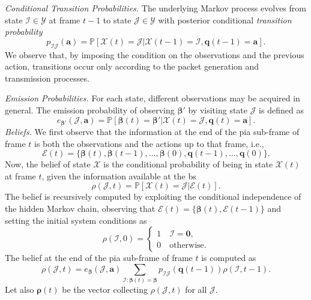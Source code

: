 \documentclass[conference]{IEEEtran}
\begin{document}
\vspace{5pt}\noindent\emph{Conditional Transition Probabilities.}
The underlying Markov process evolves from state $\bm{\mathcal{I}}\in \mathcal{Y}$  at frame $t-1$  to state $\bm{\mathcal{J}}\in \mathcal{Y}$  with  posterior conditional \textit{transition probability}
\begin{equation}\label{transProb}
    p_{\bm{\mathcal{I}}\bm{\mathcal{J}}}(\bm{a}) = \mathbb{P}\left[\bm{\mathcal{X}}(t) =\bm{\mathcal{J}} |\bm{\mathcal{X}}(t-1) = \bm{\mathcal{I}}, \bm{q}(t-1)= \bm{a}\right]. 
\end{equation}
We observe that, by imposing the condition on the observations and the previous action, transitions occur only according to the packet generation and transmission processes. 


\vspace{5pt}\noindent\emph{Emission Probabilities.}
For each state, different observations may be acquired in general. The emission probability of observing $\bm{\beta}'$ by visiting state $\bm{\mathcal{J}}$ is defined as
\begin{equation}
    e_{\bm{\beta}'}(\bm{\mathcal{J}}, \bm{a}) = \mathbb{P}[\bm{\beta}(t) = \bm{\beta}' | \bm{\mathcal{X}}(t) = \bm{\mathcal{J}}, \bm{q}(t) = \bm{a}].
\end{equation} 
\vspace{5pt}\noindent\emph{Beliefs.} We first observe that the information at the end of the \ac{pia} sub-frame of frame $t$ is both the observations and the actions up to that frame, i.e., 
\begin{equation}
\mathcal{E}(t) = \{\bm{\beta}(t),\bm{\beta}(t-1), \ldots, \bm{\beta}(0), \bm{q}(t-1), \ldots, \bm{q}(0)\}. 
\end{equation}
Now, the belief of state $\bm{\mathcal X}$ is the conditional probability of being in state $\bm{\mathcal X}(t)$ at frame $t$, given the information available at the \ac{bs}
\begin{equation}
\rho(\bm{\mathcal{J}},t) = {\mathbb P}[\bm{\mathcal X}(t) = \bm{\mathcal J}|\mathcal{E}(t)].
\end{equation}
The belief is recursively computed by exploiting the conditional independence of the hidden Markov chain, observing that $\mathcal{E}(t) = \{\bm{\beta}(t), \mathcal{E}(t-1)\}$ and setting the initial system conditions as
\begin{equation}
    \rho(\bm{\mathcal{I}}, 0)=
    \begin{cases}
        1 \quad \bm{\mathcal{I}} = \bm{0},\\
        0 \quad \text{otherwise}.  
    \end{cases}    
\end{equation}
The belief at the end of the \ac{pia} sub-frame of frame $t$ is computed as 
\begin{equation}\label{posteriorprob}
\rho(\bm{\mathcal{J}}, t) = e_{\bm{\beta}}(\bm{\mathcal{J}}, \bm{a})\sum_{\bm{\mathcal{I}}: \bm{\beta}(t) = \bm{\beta}} p_{\bm{\mathcal{I}}\bm{\mathcal{J}}}(\bm{q}(t-1))\rho(\bm{\mathcal{I}}, t-1).
\end{equation} 
Let also $\bm{\rho}(t)$ be the vector collecting  $\rho(\bm{\mathcal{J}},t)$ for all $\bm{\mathcal{J}}$.
\end{document}
